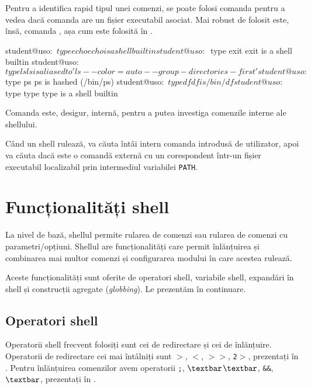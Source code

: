 Pentru a identifica rapid tipul unei comenzi, se poate folosi comanda  pentru a vedea dacă comanda are un fișier executabil asociat.
Mai robust de folosit este, însă, comanda , așa cum este folosită în .

\begin{screen}[caption={Tipul unei comenzi (type)},label={lst:cli:type}]
student@uso:~$ type echo
echo is a shell builtin
student@uso:~$ type exit
exit is a shell builtin
student@uso:~$ type ls
ls is aliased to 'ls --color=auto --group-directories-first'
student@uso:~$ type ps
ps is hashed (/bin/ps)
student@uso:~$ type df
df is /bin/df
student@uso:~$ type type
type is a shell builtin
\end{screen}

Comanda  este, desigur, internă, pentru a putea investiga comenzile interne ale shellului.

Când un shell rulează, va căuta întâi intern comanda introdusă de utilizator, apoi va căuta dacă este o comandă externă cu un corespondent într-un fișier executabil localizabil prin intermediul variabilei \texttt{PATH}.

\section{Funcționalități shell}
\label{sec:cli:shell-func}

La nivel de bază, shellul permite rularea de comenzi sau rularea de comenzi cu parametri/opțiuni.
Shellul are funcționalități care permit înlănțuirea și combinarea mai multor comenzi și configurarea modului în care acestea rulează.

Aceste funcționalități sunt oferite de operatori shell, variabile shell, expandări în shell și construcții agregate (\textit{globbing}).
Le prezentăm în continuare.

\subsection{Operatori shell}
\label{sec:cli:shell-func:operators}

Operatorii shell frecvent folosiți sunt cei de redirectare și cei de înlănțuire.
Operatorii de redirectare cei mai întâlniți sunt \texttt{$>$}, \texttt{$<$}, \texttt{$>$$>$}, \texttt{2$>$}, prezentați în .
Pentru înlănțuirea comenzilor avem operatorii \texttt{;}, \texttt{$\textbar$$\textbar$}, \texttt{\&\&}, \texttt{$\textbar$}, prezentați în .

